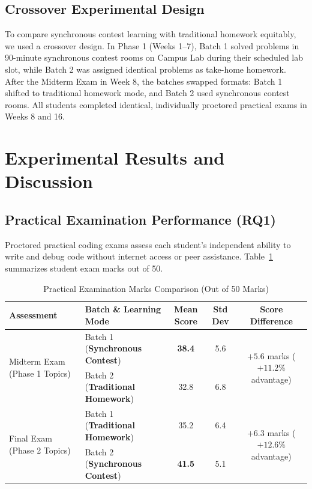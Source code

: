 \documentclass[12pt,a4paper]{article}
\begin{document}
\subsection{Crossover Experimental Design}
To compare synchronous contest learning with traditional homework equitably, we used a crossover design. In Phase 1 (Weeks 1--7), Batch 1 solved problems in 90-minute synchronous contest rooms on Campus Lab during their scheduled lab slot, while Batch 2 was assigned identical problems as take-home homework. After the Midterm Exam in Week 8, the batches swapped formats: Batch 1 shifted to traditional homework mode, and Batch 2 used synchronous contest rooms. All students completed identical, individually proctored practical exams in Weeks 8 and 16.

\section{Experimental Results and Discussion}
\label{sec:results}

\subsection{Practical Examination Performance (RQ1)}
Proctored practical coding exams assess each student's independent ability to write and debug code without internet access or peer assistance. Table~\ref{tab:exam_marks} summarizes student exam marks out of 50.

\begin{table}[!htbp]
\centering
\small
\caption{Practical Examination Marks Comparison (Out of 50 Marks)}
\label{tab:exam_marks}
\begin{tabularx}{\linewidth}{|l|l|c|c|c|}
\hline
\textbf{Assessment} & \textbf{Batch \& Learning Mode} & \textbf{Mean Score} & \textbf{Std Dev} & \textbf{Score Difference} \\
\hline
\multirow{2}{*}{Midterm Exam (Phase 1 Topics)} & Batch 1 (\textbf{Synchronous Contest}) & \textbf{38.4} & 5.6 & \multirow{2}{*}{$+5.6$ marks ($+11.2\%$ advantage)} \\
\cline{2-4}
& Batch 2 (\textbf{Traditional Homework}) & 32.8 & 6.8 & \\
\hline
\multirow{2}{*}{Final Exam (Phase 2 Topics)} & Batch 1 (\textbf{Traditional Homework}) & 35.2 & 6.4 & \multirow{2}{*}{$+6.3$ marks ($+12.6\%$ advantage)} \\
\cline{2-4}
& Batch 2 (\textbf{Synchronous Contest}) & \textbf{41.5} & 5.1 & \\
\hline
\end{tabularx}
\end{table}
\end{document}
